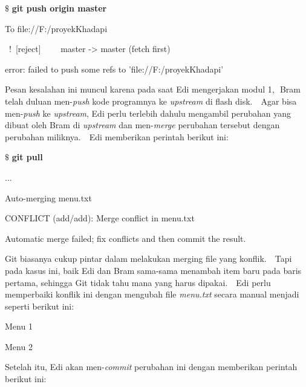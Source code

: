 \vspace{12pt}
\noindent 
 $  \$  $ \textbf{git push origin master} \par
\noindent 
To file://F:/proyekKhadapi \par
\noindent 
~!~[reject]~~~~   master -> master (fetch first) \par
\noindent 
error: failed to push some refs to 'file://F:/proyekKhadapi' \par
\noindent 
\vspace{12pt}
\noindent 
Pesan kesalahan ini muncul karena pada saat Edi mengerjakan modul 1, $  $ Bram telah duluan men-\textit{push} kode programnya ke \textit{upstream }di flash disk. $  $ $  $ Agar bisa men-\textit{push} ke \textit{upstream}, Edi perlu terlebih dahulu mengambil perubahan yang dibuat oleh Bram di \textit{upstream} dan men-\textit{merge} perubahan tersebut dengan perubahan miliknya. $  $ $  $ Edi memberikan perintah berikut ini: \par
\vspace{12pt}
\noindent 
 $  \$  $ \textbf{git pull} \par
\noindent 
... \par
\noindent 
Auto-merging menu.txt \par
\noindent 
CONFLICT (add/add): Merge conflict in menu.txt \par
\noindent 
Automatic merge failed; fix conflicts and then commit the result. \par
\noindent 
\vspace{12pt}
\noindent 
\vspace{12pt}
\noindent 
Git biasanya cukup pintar dalam melakukan merging file yang konflik. $  $ $  $ Tapi pada kasus ini, baik Edi dan Bram sama-sama menambah item baru pada baris pertama, sehingga Git tidak tahu mana yang harus dipakai. $  $ $  $ Edi perlu memperbaiki konflik ini dengan mengubah file \textit{menu.txt} secara manual menjadi seperti berikut ini: \par
\vspace{12pt}
\vspace{12pt}
\noindent 
Menu 1 \par
\noindent 
Menu 2 \par
\noindent 
\vspace{12pt}
\noindent 
\vspace{12pt}
\noindent 
Setelah itu, Edi akan men-\textit{commit} perubahan ini dengan memberikan perintah berikut ini: \par
\vspace{12pt}
